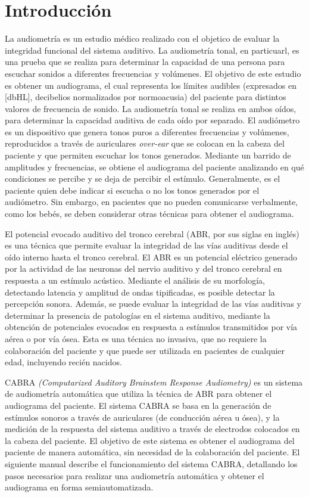 \section{Introducción} \label{introduccion}

La audiometría es un estudio médico realizado con el objetico de evaluar la integridad funcional del sistema auditivo.
La audiometría tonal, en particuarl, es una prueba que se realiza para determinar la capacidad de una persona para escuchar sonidos a diferentes frecuencias y volúmenes.
El objetivo de este estudio es obtener un audiograma, el cual representa los límites audibles (expresados en [dbHL], decibelios normalizados por normoacusia) del paciente para distintos valores de frecuencia de sonido.
La audiometría tonal se realiza en ambos oídos, para determinar la capacidad auditiva de cada oído por separado.
El audiómetro es un dispositivo que genera tonos puros a diferentes frecuencias y volúmenes, reproducidos a través de auriculares \textit{over-ear} que se colocan en la cabeza del paciente y que permiten escuchar los tonos generados.
Mediante un barrido de amplitudes y frecuencias, se obtiene el audiograma del paciente analizando en qué condiciones se percibe y se deja de percibir el estímulo.
Generalmente, es el paciente quien debe indicar si escucha o no los tonos generados por el audiómetro.
Sin embargo, en pacientes que no pueden comunicarse verbalmente, como los bebés, se deben considerar otras técnicas para obtener el audiograma.

El potencial evocado auditivo del tronco cerebral (ABR, por sus siglas en inglés) es una técnica que permite evaluar la integridad de las vías auditivas desde el oído interno hasta el tronco cerebral.
El ABR es un potencial eléctrico generado por la actividad de las neuronas del nervio auditivo y del tronco cerebral en respuesta a un estímulo acústico.
Mediante el análisis de su morfología, detectando latencia y amplitud de ondas tipificadas, es posible detectar la percepción sonora.
Además, se puede evaluar la integridad de las vías auditivas y determinar la presencia de patologías en el sistema auditivo, mediante la obtención de potenciales evocados en respuesta a estímulos transmitidos por vía aérea o por vía ósea.
Esta es una técnica no invasiva, que no requiere la colaboración del paciente y que puede ser utilizada en pacientes de cualquier edad, incluyendo recién nacidos.

CABRA \textit{(Computarized Auditory Brainstem Response Audiometry)} es un sistema de audiometría automática que utiliza la técnica de ABR para obtener el audiograma del paciente.
El sistema CABRA se basa en la generación de estímulos sonoros a través de auriculares (de conducción aérea u ósea), y la medición de la respuesta del sistema auditivo a través de electrodos colocados en la cabeza del paciente.
El objetivo de este sistema es obtener el audiograma del paciente de manera automática, sin necesidad de la colaboración del paciente.
El siguiente manual describe el funcionamiento del sistema CABRA, detallando los pasos necesarios para realizar una audiometría automática y obtener el audiograma en forma semiautomatizada.